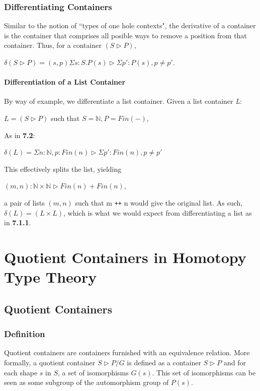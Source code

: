 \documentclass[12pt]{report}
\begin{document}
\section{Differentiating Containers}
Similar to the notion of ``types of one hole contexts", the derivative of a container is the container that comprises all posible ways to remove a position from that container.
\newpage
Thus, for a container $(S \rhd P)$,
\begin{center}
$\delta (S \rhd P) = (s,p) \Sigma s : S . P(s) \rhd \Sigma p':P(s),p \neq p'$.
\end{center}



\subsection{Differentiation of a List Container}
By way of example, we differentiate a list container. Given a list container \textit{L}:
\begin{center}
$L = (S \rhd P)$ such that $S = \mathbb{N}, P = Fin(-)$,
\end{center}
As in \textbf{7.2}:
\begin{center}
$\delta(L) = \Sigma n : \mathbb{N}, p: Fin(n) \rhd \Sigma p' : Fin(n), p \neq p'$
\end{center} 
This effectively splits the list, yielding
\begin{center}
$(m,n): \mathbb{N} \times \mathbb{N} \rhd Fin(n) + Fin(n)$,
\end{center}
a pair of lists $(m,n)$ such that m \texttt{++} n would give the original list. As such, $\delta(L) = (L \times L)$, which is what we would expect from differentiating a list as in \textbf{7.1.1}.

\part{Quotient Containers in Homotopy Type Theory}
\chapter{Quotient Containers}
\section{Definition}
Quotient containers are containers furnished with an equivalence relation. More formally, a quotient container $S \rhd P/G$ is defined as a container $S \rhd P$ and for each shape $s$ in $S$, a set of isomorphisms $G(s)$. This set of isomorphisms can be seen as some subgroup of the automorphism group of $P(s)$.
\end{document}
